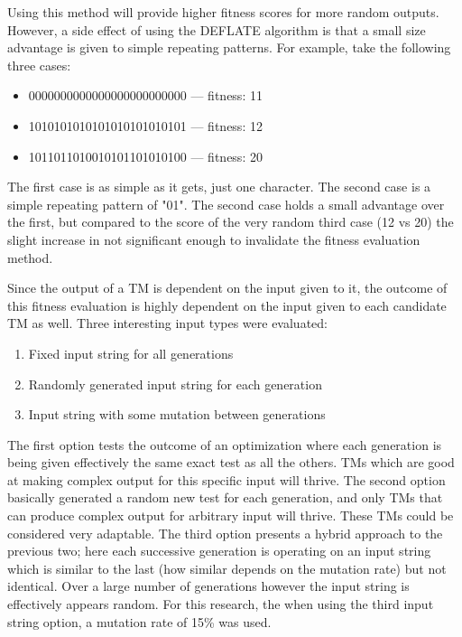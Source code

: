 Using this method will provide higher fitness scores for more random outputs. However, a side effect of using the DEFLATE algorithm is that a small size advantage is given to simple repeating patterns. For example, take the following three cases: 
\begin{itemize}
	\item 0000000000000000000000000 --- fitness: 11
	\item 1010101010101010101010101 --- fitness: 12
	\item 1011011010010101101010100 --- fitness: 20
\end{itemize}

The first case is as simple as it gets, just one character. The second case is a simple repeating pattern of "01". The second case holds a small advantage over the first, but compared to the score of the very random third case (12 vs 20) the slight increase in not significant enough to invalidate the fitness evaluation method.

Since the output of a TM is dependent on the input given to it, the outcome of this fitness evaluation is highly dependent on the input given to each candidate TM as well. Three interesting input types were evaluated: 

\begin{enumerate}
	\item Fixed input string for all generations
	\item Randomly generated input string for each generation
	\item Input string with some mutation between generations
\end{enumerate}

The first option tests the outcome of an optimization where each generation is being given effectively the same exact test as all the others. TMs which are good at making complex output for this specific input will thrive. The second option basically generated a random new test for each generation, and only TMs that can produce complex output for arbitrary input will thrive. These TMs could be considered very adaptable. The third option presents a hybrid approach to the previous two; here each successive generation is operating on an input string which is similar to the last (how similar depends on the mutation rate) but not identical. Over a large number of generations however the input string is effectively appears random. For this research, the when using the third input string option, a mutation rate of 15\% was used. 



